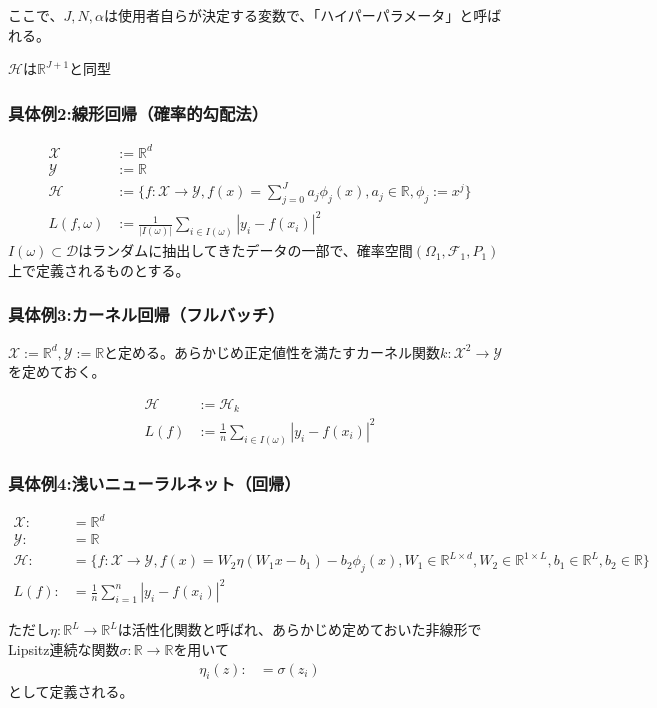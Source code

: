 \documentclass{jsarticle}
\begin{document}
ここで、$J,N,\alpha$は使用者自らが決定する変数で、「ハイパーパラメータ」と呼ばれる。

$\mathcal{H}$は$\mathbb{R}^{J+1}$と同型

\subsubsection{具体例2:線形回帰（確率的勾配法）}
\begin{align}
\mathcal{X}&:=\mathbb{R}^d\\
\mathcal{Y}&:=\mathbb{R}\\
\mathcal{H}&:=\{f:\mathcal{X}\to\mathcal{Y},f(x)=\sum^J_{j=0}a_j\phi_j(x),a_j\in\mathbb{R},\phi_j:=x^j\}\\
L(f,\omega)&:=\frac{1}{|I(\omega)|}\sum_{i\in I(\omega)}|y_i-f(x_i)|^2
\end{align}
$I(\omega)\subset \mathcal{D}$はランダムに抽出してきたデータの一部で、確率空間$(\Omega_1,\mathcal{F}_1,P_1)$上で定義されるものとする。

\subsubsection{具体例3:カーネル回帰（フルバッチ）}
$\mathcal{X}:=\mathbb{R}^d,\mathcal{Y}:=\mathbb{R}$と定める。あらかじめ正定値性を満たすカーネル関数$k:\mathcal{X}^2\to\mathcal{Y}$を定めておく。

\begin{align}
\mathcal{H}&:=\mathcal{H}_k\\
L(f)&:=\frac{1}{n}\sum_{i\in I(\omega)}|y_i-f(x_i)|^2
\end{align}


\subsubsection{具体例4:浅いニューラルネット（回帰）}
\begin{align}
\mathcal{X}:&=\mathbb{R}^d\\
\mathcal{Y}:&=\mathbb{R}\\
\mathcal{H}:&=\{f:\mathcal{X}\to\mathcal{Y},f(x)=W_2\eta(W_1x-b_1)-b_2\phi_j(x),W_1\in\mathbb{R}^{L\times d},W_2\in \mathbb{R}^{1\times L},b_1\in\mathbb{R}^L,b_2\in\mathbb{R}\}\\
L(f):&=\frac{1}{n}\sum^n_{i=1}|y_i-f(x_i)|^2
\end{align}

ただし$\eta:\mathbb{R}^L\to\mathbb{R}^L$は活性化関数と呼ばれ、あらかじめ定めておいた非線形でLipsitz連続な関数$\sigma:\mathbb{R}\to\mathbb{R}$を用いて
\begin{align}
\eta_i(z):&=\sigma(z_i)
\end{align}
として定義される。
\end{document}
